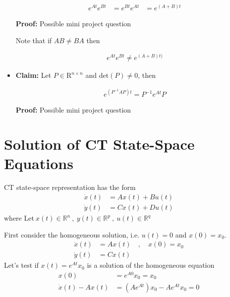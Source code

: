 \documentclass[twoside]{article}
\begin{document}
\begin{itemize}
\begin{align*}
	e^{A t} e^{B t} &= e^{B t} e^{A t} &= e^{(A + B) t} 
\end{align*}

\textbf{Proof:} Possible mini project question

\par 

Note that if $A B \neq B A$ then

\begin{align*}
	e^{A t} e^{B t} \neq e^{(A + B) t)} 
\end{align*}

\item \textbf{Claim:} Let $P \in \mathrm{R}^{n \times n}$ and
 $\mathrm{det}(P) \neq 0$, then

\begin{align*}
	e^{\left(P^{-1} A P \right) t} = P^{-1} e^{A t} P
\end{align*}

\textbf{Proof:} Possible mini project question

\end{itemize}

\section*{Solution of CT State-Space Equations}

CT state-space representation has the form
%
\begin{align*}
  \dot{x}(t) &= A x(t) + B u(t)
\\
 \dot{y}(t) &= C x(t) + D u(t)
\end{align*}
%
where $\mathrm{Let} \ x(t) \in \mathbb{R}^n \ , \ y(t) \in \mathbb{R}^p \ ,\  u(t) \in
  \mathbb{R}^q$

First consider the homogeneous solution, i.e. $u(t) = 0$ and $x(0) =
x_0$.
%
\begin{align*}
  \dot{x}(t) &= A x(t) \quad , \quad x(0) = x_0
\\
 \dot{y}(t) &= C x(t) 
\end{align*}
%
Let's test if $x(t) = e^{A t} x_0$ is a solution of the homogeneous 
equation
%
%
\begin{align*}
  x(0) &= e^{A 0} x_0 = x_0
  \\
  \dot{x}(t) - A x(t) &= \left( A e^{At} \right) x_0 - A e^{At} x_0 = 0
\end{align*}
%
\end{document}
